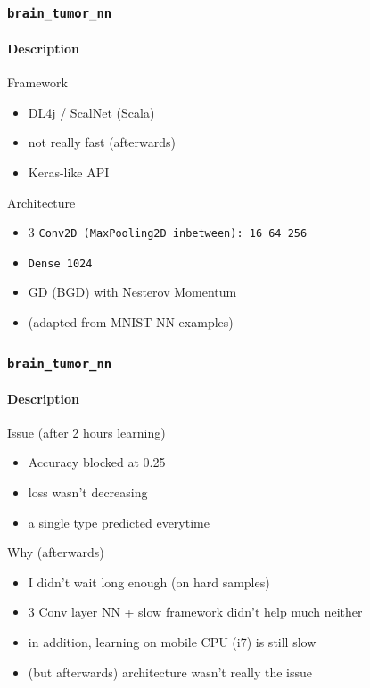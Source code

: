 \documentclass[]{beamer}
\newcommand{\btn}{\tt{brain\_tumor\_nn}}
\begin{document}
\begin{frame}
  \frametitle{\btn}
  \framesubtitle{Description}
  \begin{block}{Framework}
    \begin{itemize}
      \item DL4j / ScalNet (Scala)
      \item not really fast (afterwards)
      \item Keras-like API
    \end{itemize}
  \end{block}
  \begin{exampleblock}{Architecture}
    \begin{itemize}
      \item 3 \tt{Conv2D} (\tt{MaxPooling2D} inbetween): 16 64 256
      \item \tt{Dense} 1024
      \item GD (BGD) with Nesterov Momentum
      \item (adapted from MNIST NN examples)
    \end{itemize}
  \end{exampleblock}
\end{frame}

\begin{frame}
  \frametitle{\btn}
  \framesubtitle{Description}
  \begin{block}{Issue (after 2 hours learning)}
    \begin{itemize}
      \item Accuracy blocked at 0.25
      \item loss wasn't decreasing
      \item a \alert{single type} predicted everytime
    \end{itemize}
  \end{block}
  \begin{exampleblock}{Why (afterwards)}
    \begin{itemize}
      \item I didn't wait long enough (on hard samples)
      \item 3 Conv layer NN + slow framework didn't help much neither
      \item in addition, learning on mobile CPU (i7) is still slow
      \item (but afterwards) architecture wasn't really the issue
    \end{itemize}
  \end{exampleblock}
\end{frame}
\end{document}
